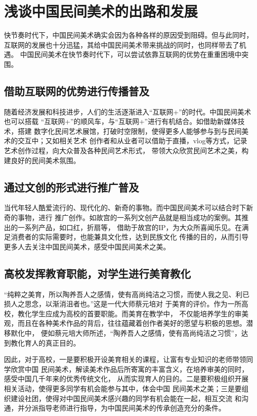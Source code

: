 \section{浅谈中国民间美术的出路和发展}
快节奏时代下，中国民间美术确实会因为各种各样的原因受到阻碍。但与此同时，
互联网的发展也十分迅猛，其给中国民间美术带来挑战的同时，也同样带去了机遇。
中国民间美术在快节奏时代下，可以尝试依靠互联网的优势在重重困境中突围。
\subsection{借助互联网的优势进行传播普及}
随着经济发展和科技进步，人们的生活逐渐进入“互联网+”的时代。中国民间美术也可以搭载
“互联网+”的顺风车，与“互联网+”进行有机结合。如借助新媒体技术，搭建
数字化民间艺术展馆，打破时空限制，使得更多人能够参与到与民间美术的交互中；又如相关艺术
创作者和从业者可以借助于直播，vlog等方式，记录艺术创作过程，向大众普及各种民间艺术形式，
带领大众欣赏民间艺术之美，构建良好的民间美术氛围。
\subsection{通过文创的形式进行推广普及}
当代年轻人酷爱流行的、现代化的、新奇的事物。而中国民间美术可以结合时下新奇的事物，进行
推广创作。如故宫的一系列文创产品就是相当成功的案例。其推出的一系列产品，如口红，折扇等，
借助于故宫的IP，为大众所喜闻乐见。在满足消费者的实际需要时，也能兼具文化性，达到民族文化
传播的目的，从而引导更多人去关注中国民间美术，感受中国民间美术之美。

\subsection{高校发挥教育职能，对学生进行美育教化}
“纯粹之美育，所以陶养吾人之感情，使有高尚纯洁之习惯，而使人我之见、利已损人之思念，以渐消沮者也。”这是一代大师蔡元培对
于美育的评价。作为一所高校，教化学生应成为高校的首要职能。而美育在教学中，
不仅能培养学生的审美观，而且在各种美术作品的背后，往往蕴藏着创作者美好的愿望与积极的思想。潜移默化中，
便如蔡元培大师所述，“陶养吾人之感情，使有高尚纯洁之习惯”，达到教化育人的真正目的。

因此，对于高校，一是要积极开设美育相关的课程，让富有专业知识的老师带领同学欣赏中国
民间美术，解读美术作品后所寄寓的丰富含义，在培养审美的同时，感受中国几千年来的优秀传统文化，
从而实现育人的目的。二是要积极组织开展相关活动，使得更多同学有机会能参与其中，体会中国
民间美术之美；三是要组织建设社团，使得对中国民间美术感兴趣的同学有机会能在一起，相互交流
和沟通，并分派指导老师进行指导，为中国民间美术的传承创造充分的条件。

